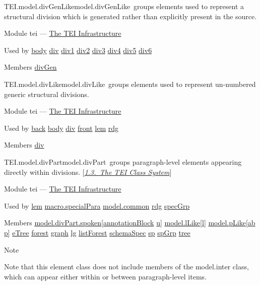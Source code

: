 \begin{reflist}
\item[]\begin{specHead}{TEI.model.divGenLike}{model.divGenLike} groups elements used to represent a structural division which is generated rather than explicitly present in the source.\end{specHead} 
    \item[{Module}]
  tei — \hyperref[ST]{The TEI Infrastructure}
    \item[{Used by}]
  \hyperref[TEI.body]{body} \hyperref[TEI.div]{div} \hyperref[TEI.div1]{div1} \hyperref[TEI.div2]{div2} \hyperref[TEI.div3]{div3} \hyperref[TEI.div4]{div4} \hyperref[TEI.div5]{div5} \hyperref[TEI.div6]{div6}
    \item[{Members}]
  \hyperref[TEI.divGen]{divGen}
\end{reflist}  
\begin{reflist}
\item[]\begin{specHead}{TEI.model.divLike}{model.divLike} groups elements used to represent un-numbered generic structural divisions.\end{specHead} 
    \item[{Module}]
  tei — \hyperref[ST]{The TEI Infrastructure}
    \item[{Used by}]
  \hyperref[TEI.back]{back} \hyperref[TEI.body]{body} \hyperref[TEI.div]{div} \hyperref[TEI.front]{front} \hyperref[TEI.lem]{lem} \hyperref[TEI.rdg]{rdg}
    \item[{Members}]
  \hyperref[TEI.div]{div}
\end{reflist}  
\begin{reflist}
\item[]\begin{specHead}{TEI.model.divPart}{model.divPart} groups paragraph-level elements appearing directly within divisions. [\textit{\hyperref[STEC]{1.3.\ The TEI Class System}}]\end{specHead} 
    \item[{Module}]
  tei — \hyperref[ST]{The TEI Infrastructure}
    \item[{Used by}]
  \hyperref[TEI.lem]{lem} \hyperref[TEI.macro.specialPara]{macro.specialPara} \hyperref[TEI.model.common]{model.common} \hyperref[TEI.rdg]{rdg} \hyperref[TEI.specGrp]{specGrp}
    \item[{Members}]
  \hyperref[TEI.model.divPart.spoken]{model.divPart.spoken}[\hyperref[TEI.annotationBlock]{annotationBlock} \hyperref[TEI.u]{u}] \hyperref[TEI.model.lLike]{model.lLike}[\hyperref[TEI.l]{l}] \hyperref[TEI.model.pLike]{model.pLike}[\hyperref[TEI.ab]{ab} \hyperref[TEI.p]{p}] \hyperref[TEI.eTree]{eTree} \hyperref[TEI.forest]{forest} \hyperref[TEI.graph]{graph} \hyperref[TEI.lg]{lg} \hyperref[TEI.listForest]{listForest} \hyperref[TEI.schemaSpec]{schemaSpec} \hyperref[TEI.sp]{sp} \hyperref[TEI.spGrp]{spGrp} \hyperref[TEI.tree]{tree}
    \item[{Note}]
  \par
Note that this element class does not include members of the \textsf{model.inter} class, which can appear either within or between paragraph-level items.
\end{reflist}  
